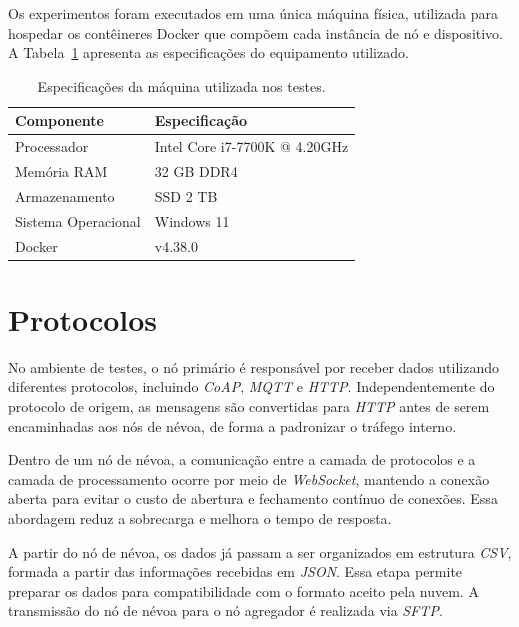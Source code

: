 Os experimentos foram executados em uma única máquina física, utilizada para hospedar os contêineres Docker que compõem cada instância de nó e dispositivo. A Tabela~\ref{tab:especificacoes_maquina} apresenta as especificações do equipamento utilizado.

\begin{table}[htb]
    \caption{\label{tab:especificacoes_maquina}Especificações da máquina utilizada nos testes.}
    \centering
    \begin{tabular}{ll}
        \hline
            \textbf{Componente} & \textbf{Especificação} \\
        \hline
            Processador & Intel Core i7-7700K @ 4.20GHz \\
            Memória RAM & 32 GB DDR4 \\
            Armazenamento & SSD 2 TB \\
            Sistema Operacional & Windows 11 \\
            Docker & v4.38.0 \\
        \hline
    \end{tabular}
\end{table}

\section{Protocolos}

No ambiente de testes, o nó primário é responsável por receber dados utilizando diferentes protocolos, incluindo \textit{CoAP}, \textit{MQTT} e \textit{HTTP}. Independentemente do protocolo de origem, as mensagens são convertidas para \textit{HTTP} antes de serem encaminhadas aos nós de névoa, de forma a padronizar o tráfego interno.

Dentro de um nó de névoa, a comunicação entre a camada de protocolos e a camada de processamento ocorre por meio de \textit{WebSocket}, mantendo a conexão aberta para evitar o custo de abertura e fechamento contínuo de conexões. Essa abordagem reduz a sobrecarga e melhora o tempo de resposta.

A partir do nó de névoa, os dados já passam a ser organizados em estrutura \textit{CSV}, formada a partir das informações recebidas em \textit{JSON}. Essa etapa permite preparar os dados para compatibilidade com o formato aceito pela nuvem. A transmissão do nó de névoa para o nó agregador é realizada via \textit{SFTP}.

